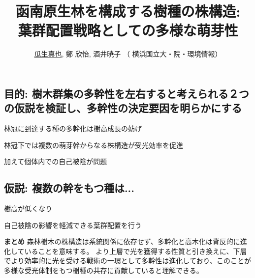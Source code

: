 \documentclass[a0, 36pt, plainboxedsections]{sciposter} %
\title{\textcolor{Orange1}{函南原生林を構成する樹種の株構造:\\葉群配置戦略としての多様な萌芽性}}
\author{\faUser \hspace{0.02em} \underline{瓜生真也}, 鄭 欣怡, 酒井暁子 （\faUniv \hspace{0.02em} 横浜国立大・院・環境情報） \normalsize{\faEnvelope \hspace{0.02em} \fontspec{ComicSansMS}{suika1127@gmail.com}}}
\begin{document}
\maketitle
\vspace{-2em}
\begin{multicols}{2}
\begin{mdframed}[style=section.frame]
  \centering\huge\textbf{}
\end{mdframed}

\subsection*{目的: 樹木群集の多幹性を左右すると考えられる２つの仮説を検証し、多幹性の決定要因を明らかにする} %

林冠に到達する種の多幹化は樹高成長の妨げ

林冠下では複数の萌芽幹からなる株構造が受光効率を促進

加えて個体内での自己被陰が問題

\subsection*{仮説: 複数の幹をもつ種は...}

\begin{list}{}{\setlength{\itemindent}{1em}} %
 \item 樹高が低くなり
 \item 自己被陰の影響を軽減できる葉群配置を行う
\end{list}

\columnbreak
\begin{mdframed}[style=conclusion.frame]
  \centering\huge\textbf{\faFlagAlt \vspace{0.02em} まとめ}
  \flushleft\normalsize{
  森林樹木の株構造は系統関係に依存せず、多幹化と高木化は背反的に進化していることを意味する。
  より上層で光を獲得する性質と引き換えに、下層でより効率的に光を受ける戦術の一環として多幹性は進化しており、このことが多様な受光体制をもつ樹種の共存に貢献していると理解できる。
  }
\end{mdframed}

\end{multicols}
\end{document}
